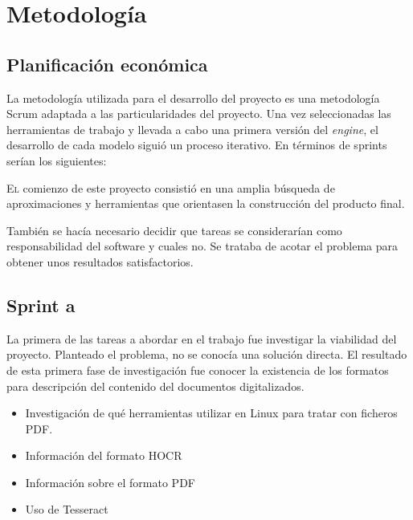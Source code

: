 
\chapter{Metodología}
\label{chap:metodologia}

\section{Planificación económica}

La metodología utilizada para el desarrollo del proyecto es una metodología Scrum adaptada a las particularidades del proyecto. Una vez seleccionadas las herramientas de trabajo y llevada a cabo una primera versión del \emph{engine}, el desarrollo de cada modelo siguió un proceso iterativo. En términos de sprints serían los siguientes:

\lettrine{E}{l} comienzo de este proyecto consistió en una amplia búsqueda de aproximaciones y herramientas que orientasen la construcción del producto final.

También se hacía necesario decidir que tareas se considerarían como responsabilidad del software y cuales no. Se trataba de acotar el problema para obtener unos resultados satisfactorios. 

\section{Sprint a}

La primera de las tareas a abordar en el trabajo fue investigar la viabilidad del proyecto. Planteado el problema, no se conocía una solución directa. El resultado de esta primera fase de investigación fue conocer la existencia de los formatos para descripción del contenido del documentos digitalizados.

\begin{itemize}
    \item Investigación de qué herramientas utilizar en Linux para tratar con ficheros PDF.
    \item Información del formato HOCR
    \item Información sobre el formato PDF
    \item Uso de Tesseract
\end{itemize}


